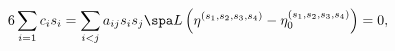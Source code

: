 \begin{equation}
\label{susycount}
6 \sum_{i=1} c_i s_i = \sum_{i<j} a_{ij} s_i s_j  
\spa
L \left( \eta^{(s_1,s_2,s_3,s_4)} - \eta_0^{(s_1,s_2,s_3,s_4)} \right) = 0,
\end{equation}

